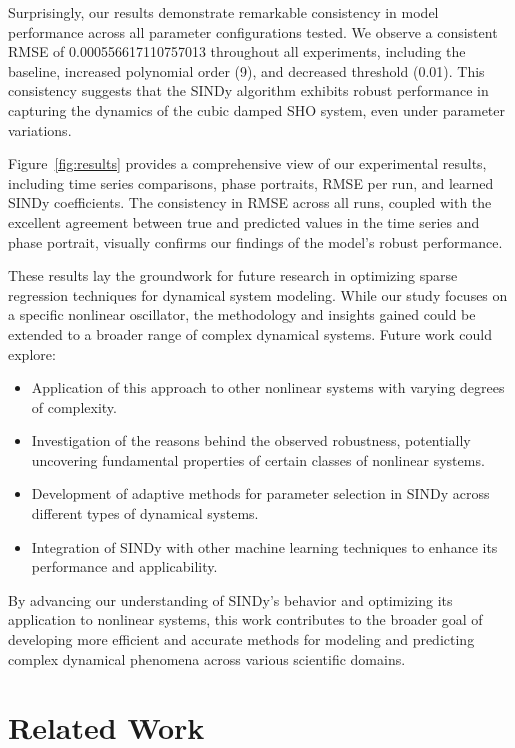 \documentclass{article} %
\begin{document}
Surprisingly, our results demonstrate remarkable consistency in model performance across all parameter configurations tested. We observe a consistent RMSE of 0.000556617110757013 throughout all experiments, including the baseline, increased polynomial order (9), and decreased threshold (0.01). This consistency suggests that the SINDy algorithm exhibits robust performance in capturing the dynamics of the cubic damped SHO system, even under parameter variations.

Figure~\ref{fig:results} provides a comprehensive view of our experimental results, including time series comparisons, phase portraits, RMSE per run, and learned SINDy coefficients. The consistency in RMSE across all runs, coupled with the excellent agreement between true and predicted values in the time series and phase portrait, visually confirms our findings of the model's robust performance.

These results lay the groundwork for future research in optimizing sparse regression techniques for dynamical system modeling. While our study focuses on a specific nonlinear oscillator, the methodology and insights gained could be extended to a broader range of complex dynamical systems. Future work could explore:

\begin{itemize}
    \item Application of this approach to other nonlinear systems with varying degrees of complexity.
    \item Investigation of the reasons behind the observed robustness, potentially uncovering fundamental properties of certain classes of nonlinear systems.
    \item Development of adaptive methods for parameter selection in SINDy across different types of dynamical systems.
    \item Integration of SINDy with other machine learning techniques to enhance its performance and applicability.
\end{itemize}

By advancing our understanding of SINDy's behavior and optimizing its application to nonlinear systems, this work contributes to the broader goal of developing more efficient and accurate methods for modeling and predicting complex dynamical phenomena across various scientific domains.

\section{Related Work}
\label{sec:related}
\end{document}
